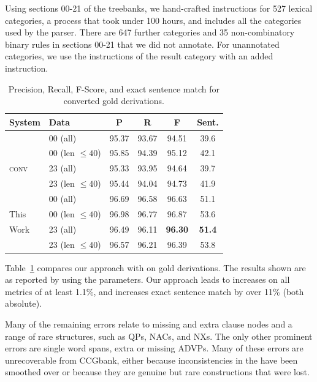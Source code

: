 Using sections 00-21 of the treebanks, we hand-crafted instructions for 527
lexical categories, a process that took under 100 hours, and includes all the
categories used by the \candc parser.  There are 647 further categories and 35
non-combinatory binary rules in sections 00-21 that we did not annotate.  For
unannotated categories, we use the instructions of the result category with an
added instruction.

\begin{table}
\renewcommand{\tabcolsep}{1.65mm}
\small
\begin{center}
\begin{tabular}{llcccc}
	\hline
		System & Data & P & R & F & Sent. \\
	\hline
	\hline
		 & 00 (all) & 95.37 & 93.67 & 94.51 & 39.6 \\
		\candc & 00 (len $\le 40$) & 95.85 & 94.39 & 95.12 & 42.1 \\
		\textsc{conv} & 23 (all) & 95.33 & 93.95 & 94.64 & 39.7 \\
		 & 23 (len $\le 40$) & 95.44 & 94.04 & 94.73 & 41.9 \\
	\hline
		 & 00 (all) & 96.69 & 96.58 & 96.63 & 51.1 \\
		This & 00 (len $\le 40$) & 96.98 & 96.77 & 96.87 & 53.6 \\
		Work & 23 (all) & 96.49 & 96.11 & \textbf{96.30} & \textbf{51.4} \\
		 & 23 (len $\le 40$) & 96.57 & 96.21 & 96.39 & 53.8 \\
	\hline
\end{tabular}
\end{center}
\caption{\label{tab:conversion-comparison}
	\parseval Precision, Recall, F-Score, and exact sentence match for converted
	gold \ccg derivations.
}
\end{table}

Table~\ref{tab:conversion-comparison} compares our approach
with \old on gold \ccg derivations.  The results shown are 
as reported by \evalb
\parencite{Black-etal:1991} using the \textcite{Collins:1997} parameters.
Our approach leads to increases on all metrics of at least 1.1\%, and
increases exact sentence match by over 11\% (both absolute).

Many of the remaining errors relate to missing and extra clause nodes and a
range of rare structures, such as QPs, NACs, and NXs. The only other prominent
errors are single word spans, \myeg extra or missing ADVPs.  Many of these errors
are unrecoverable from CCGbank, either because inconsistencies in the \ptb have
been smoothed over or because they are genuine but rare constructions that
were lost.

